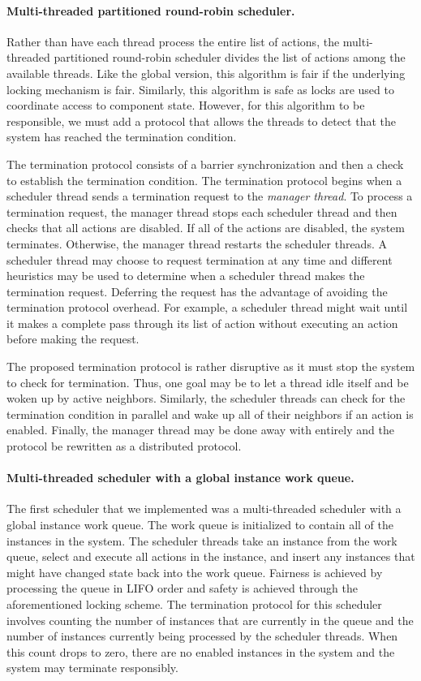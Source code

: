 \paragraph{Multi-threaded partitioned round-robin scheduler.}
Rather than have each thread process the entire list of actions, the multi-threaded partitioned round-robin scheduler divides the list of actions among the available threads.
Like the global version, this algorithm is fair if the underlying locking mechanism is fair.
Similarly, this algorithm is safe as locks are used to coordinate access to component state.
However, for this algorithm to be responsible, we must add a protocol that allows the threads to detect that the system has reached the termination condition.

The termination protocol consists of a barrier synchronization and then a check to establish the termination condition.
The termination protocol begins when a scheduler thread sends a termination request to the \emph{manager thread}.
To process a termination request, the manager thread stops each scheduler thread and then checks that all actions are disabled.
If all of the actions are disabled, the system terminates.
Otherwise, the manager thread restarts the scheduler threads.
A scheduler thread may choose to request termination at any time and different heuristics may be used to determine when a scheduler thread makes the termination request.
Deferring the request has the advantage of avoiding the termination protocol overhead.
For example, a scheduler thread might wait until it makes a complete pass through its list of action without executing an action before making the request.

The proposed termination protocol is rather disruptive as it must stop the system to check for termination.
Thus, one goal may be to let a thread idle itself and be woken up by active neighbors.
Similarly, the scheduler threads can check for the termination condition in parallel and wake up all of their neighbors if an action is enabled.
Finally, the manager thread may be done away with entirely and the protocol be rewritten as a distributed protocol.

\paragraph{Multi-threaded scheduler with a global instance work queue.}
The first scheduler that we implemented was a multi-threaded scheduler with a global instance work queue.
The work queue is initialized to contain all of the instances in the system.
The scheduler threads take an instance from the work queue, select and execute all actions in the instance, and insert any instances that might have changed state back into the work queue.
Fairness is achieved by processing the queue in LIFO order and safety is achieved through the aforementioned locking scheme.
The termination protocol for this scheduler involves counting the number of instances that are currently in the queue and the number of instances currently being processed by the scheduler threads.
When this count drops to zero, there are no enabled instances in the system and the system may terminate responsibly.

